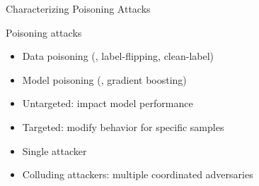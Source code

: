 \begin{frame}{Characterizing Poisoning Attacks}
  \centering
  \begin{tcolorbox}[
    enhanced,
    colback=imta/green,
    boxrule=0pt,
    frame hidden,
    fontupper=\large\bfseries,
    hbox,
    colupper=white,
  ]
    Poisoning attacks
  \end{tcolorbox}
  
  \vspace{1em}
  
  \setlength{\leftmargini}{5pt}
  \begin{tcbraster}[raster columns=3, raster equal height, raster column skip=1.5em]
    \pause
    \begin{taxobox}[Component]
      \begin{itemize}
        \item Data poisoning (\eg, \alert<5>{label-flipping}, clean-label)
        \item Model poisoning (\eg, gradient boosting)
      \end{itemize}
    \end{taxobox}
    \pause
    \begin{taxobox}[Objective]
      \begin{itemize}
        \item Untargeted: impact model performance
        \item Targeted: modify behavior for specific samples
      \end{itemize}
    \end{taxobox}
    \pause
    \begin{taxobox}[Proportion]
      \begin{itemize}
        \item Single attacker
        \item Colluding attackers: multiple coordinated adversaries
      \end{itemize}
    \end{taxobox}
  \end{tcbraster}
\end{frame}
  

